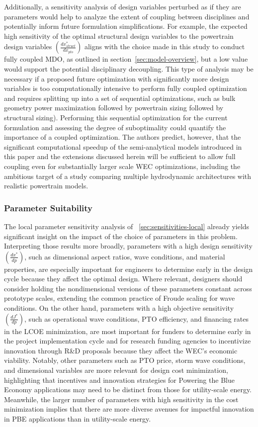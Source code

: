 Additionally, a sensitivity analysis of design variables perturbed as if they are parameters would help to analyze the extent of coupling between disciplines and potentially inform future formulation simplifications.
For example, the expected high sensitivity of the optimal structural design variables to the powertrain design variables $\left(\frac{dx^*_{struct}}{dx_{pto}}\right)$ aligns with the choice made in this study to conduct fully coupled MDO, as outlined in section~\ref{sec:model-overview}, but a low value would support the potential disciplinary decoupling.
This type of analysis may be necessary if a proposed future optimization with significantly more design variables is too computationally intensive to perform fully coupled optimization and requires splitting up into a set of sequential optimizations, such as bulk geometry power maximization followed by powertrain sizing followed by structural sizing).
Performing this sequential optimization for the current formulation and assessing the degree of suboptimality could quantify the importance of a coupled optimization.
The authors predict, however, that the significant computational speedup of the semi-analytical models introduced in this paper and the extensions discussed herein will be sufficient to allow full coupling even for substantially larger scale WEC optimizations, including the ambitious target of a study comparing multiple hydrodynamic architectures with realistic powertrain models.

\subsubsection{Parameter Suitability}
The local parameter sensitivity analysis of \sectionautorefname~\ref{sec:sensitivities-local} already yields significant insight on the impact of the choice of parameters in this problem.
Interpreting those results more broadly, parameters with a high design sensitivity $\left(\frac{dx^*}{dp}\right)$, such as dimensional aspect ratios, wave conditions, and material properties, are especially important for engineers to determine early in the design cycle because they affect the optimal design. 
Where relevant, designers should consider holding the nondimensional versions of these parameters constant across prototype scales, extending the common practice of Froude scaling for wave conditions.
On the other hand, parameters with a high objective sensitivity $\left(\frac{dJ^*}{dp}\right)$, such as operational wave conditions, PTO efficiency, and financing rates in the LCOE minimization, are most important for funders to determine early in the project implementation cycle and for research funding agencies to incentivize innovation through R\&D proposals because they affect the WEC's economic viability.
Notably, other parameters such as PTO price, storm wave conditions, and dimensional variables are more relevant for design cost minimization, highlighting that incentives and innovation strategies for Powering the Blue Economy applications may need to be distinct from those for utility-scale energy.
Meanwhile, the larger number of parameters with high sensitivity in the cost minimization implies that there are more diverse avenues for impactful innovation in PBE applications than in utility-scale energy.


